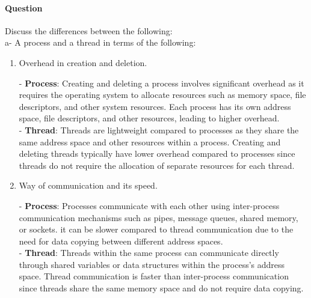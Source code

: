 \documentclass[a4paper,12pt,fleqn]{article}
\newcounter{question}
\newcommand*\question{%
\stepcounter{question}%
\paragraph{Question \thequestion}}
\begin{document}
\question 
{Discuss the differences between the following:
\\a- A process and a thread in terms of the following: }
\begin{enumerate}

\item{Overhead in creation and deletion.}
\begin{answer}
{ 
- \textbf{Process}: Creating and deleting a process involves significant overhead as it requires the operating system to allocate resources such as memory space, file descriptors, and other system resources. Each process has its own address space, file descriptors, and other resources, leading to higher overhead.\\
- \textbf{Thread}: Threads are lightweight compared to processes as they share the same address space and other resources within a process. Creating and deleting threads typically have lower overhead compared to processes since threads do not require the allocation of separate resources for each thread.
}
\end{answer}

\item{Way of communication and its speed.}
\begin{answer}
{
- \textbf{Process}: Processes communicate with each other using inter-process communication  mechanisms such as pipes, message queues, shared memory, or sockets. it can be slower compared to thread communication due to the need for data copying between different address spaces.\\
- \textbf{Thread}: Threads within the same process can communicate directly through shared variables or data structures within the process's address space. Thread communication is faster than inter-process communication since threads share the same memory space and do not require data copying.
}
\end{answer}

\end{enumerate}


\end{document}
